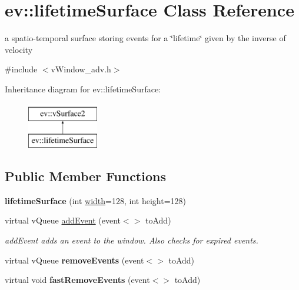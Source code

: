 \hypertarget{classev_1_1lifetimeSurface}{}\section{ev\+:\+:lifetime\+Surface Class Reference}
\label{classev_1_1lifetimeSurface}


a spatio-\/temporal surface storing events for a \char`\"{}lifetime\char`\"{} given by the inverse of velocity  




{\ttfamily \#include $<$v\+Window\+\_\+adv.\+h$>$}

Inheritance diagram for ev\+:\+:lifetime\+Surface\+:\begin{figure}[H]
\begin{center}
\leavevmode
\includegraphics[height=2.000000cm]{classev_1_1lifetimeSurface}
\end{center}
\end{figure}
\subsection*{Public Member Functions}
\begin{DoxyCompactItemize}
\item 
{\bfseries lifetime\+Surface} (int \hyperlink{classev_1_1vSurface2_a1aa8027816352a15d5b9bf1f26f48e76}{width}=128, int height=128)\hypertarget{classev_1_1lifetimeSurface_a8276286d48b5baf2829268333f99b482}{}\label{classev_1_1lifetimeSurface_a8276286d48b5baf2829268333f99b482}

\item 
virtual v\+Queue \hyperlink{classev_1_1lifetimeSurface_a8fce037a13281c0e46c7d660e0ea2275}{add\+Event} (event$<$$>$ to\+Add)
\begin{DoxyCompactList}\small\item\em add\+Event adds an event to the window. Also checks for expired events. \end{DoxyCompactList}\item 
virtual v\+Queue {\bfseries remove\+Events} (event$<$$>$ to\+Add)\hypertarget{classev_1_1lifetimeSurface_a86fde904d007b5b1e5f52351bfab0b17}{}\label{classev_1_1lifetimeSurface_a86fde904d007b5b1e5f52351bfab0b17}

\item 
virtual void {\bfseries fast\+Remove\+Events} (event$<$$>$ to\+Add)\hypertarget{classev_1_1lifetimeSurface_a5502828fe59c4394588acb6ffa06d445}{}\label{classev_1_1lifetimeSurface_a5502828fe59c4394588acb6ffa06d445}

\end{DoxyCompactItemize}
